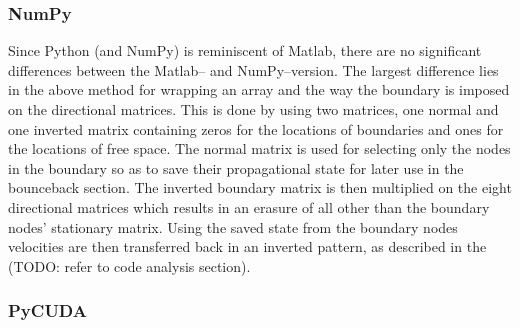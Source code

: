 \subsubsection{NumPy}
Since Python (and NumPy) is reminiscent of Matlab, there are no significant differences between the Matlab-- and NumPy--version. The largest difference lies in the above method for wrapping an array and the way the boundary is imposed on the directional matrices. This is done by using two matrices, one normal and one inverted matrix containing zeros for the locations of boundaries and ones for the locations of free space. The normal matrix is used for selecting only the nodes in the boundary so as to save their propagational state for later use in the bounceback section. The inverted boundary matrix is then multiplied on the eight directional matrices which results in an erasure of all other than the boundary nodes' stationary matrix. Using the saved state from the boundary nodes velocities are then transferred back in an inverted pattern, as described in the (TODO: refer to code analysis section).

\subsubsection{PyCUDA}







